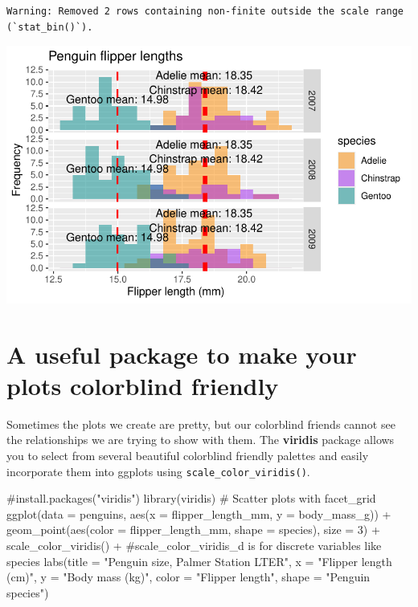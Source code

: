 \documentclass[
  letterpaper,
  DIV=11,
  numbers=noendperiod]{scrreprt}
\newenvironment{Shaded}{\begin{snugshade}}{\end{snugshade}}
\newcommand{\AttributeTok}[1]{\textcolor[rgb]{0.40,0.45,0.13}{#1}}
\newcommand{\CommentTok}[1]{\textcolor[rgb]{0.37,0.37,0.37}{#1}}
\newcommand{\DecValTok}[1]{\textcolor[rgb]{0.68,0.00,0.00}{#1}}
\newcommand{\FunctionTok}[1]{\textcolor[rgb]{0.28,0.35,0.67}{#1}}
\newcommand{\NormalTok}[1]{\textcolor[rgb]{0.00,0.23,0.31}{#1}}
\newcommand{\SpecialCharTok}[1]{\textcolor[rgb]{0.37,0.37,0.37}{#1}}
\newcommand{\StringTok}[1]{\textcolor[rgb]{0.13,0.47,0.30}{#1}}
\begin{document}
\begin{verbatim}
Warning: Removed 2 rows containing non-finite outside the scale range
(`stat_bin()`).
\end{verbatim}

\includegraphics{scripts/02_dataViz/class4_files/figure-pdf/facet_grid-3.pdf}

\section{A useful package to make your plots colorblind
friendly}\label{a-useful-package-to-make-your-plots-colorblind-friendly}

Sometimes the plots we create are pretty, but our colorblind friends
cannot see the relationships we are trying to show with them. The
\textbf{viridis} package allows you to select from several beautiful
colorblind friendly palettes and easily incorporate them into ggplots
using \texttt{scale\_color\_viridis()}.

\begin{Shaded}
\begin{Highlighting}[]
\CommentTok{\#install.packages("viridis")}
\FunctionTok{library}\NormalTok{(viridis)}
\CommentTok{\# Scatter plots with facet\_grid}
\FunctionTok{ggplot}\NormalTok{(}\AttributeTok{data =}\NormalTok{ penguins, }\FunctionTok{aes}\NormalTok{(}\AttributeTok{x =}\NormalTok{ flipper\_length\_mm, }\AttributeTok{y =}\NormalTok{ body\_mass\_g)) }\SpecialCharTok{+}
  \FunctionTok{geom\_point}\NormalTok{(}\FunctionTok{aes}\NormalTok{(}\AttributeTok{color =}\NormalTok{ flipper\_length\_mm, }\AttributeTok{shape =}\NormalTok{ species), }\AttributeTok{size =} \DecValTok{3}\NormalTok{) }\SpecialCharTok{+}
  \FunctionTok{scale\_color\_viridis}\NormalTok{() }\SpecialCharTok{+} \CommentTok{\#scale\_color\_viridis\_d is for discrete variables like species}
  \FunctionTok{labs}\NormalTok{(}\AttributeTok{title =} \StringTok{"Penguin size, Palmer Station LTER"}\NormalTok{,}
       \AttributeTok{x =} \StringTok{"Flipper length (cm)"}\NormalTok{,}
       \AttributeTok{y =} \StringTok{"Body mass (kg)"}\NormalTok{,}
       \AttributeTok{color =} \StringTok{"Flipper length"}\NormalTok{,}
       \AttributeTok{shape =} \StringTok{"Penguin species"}\NormalTok{)}
\end{Highlighting}
\end{Shaded}
\end{document}
